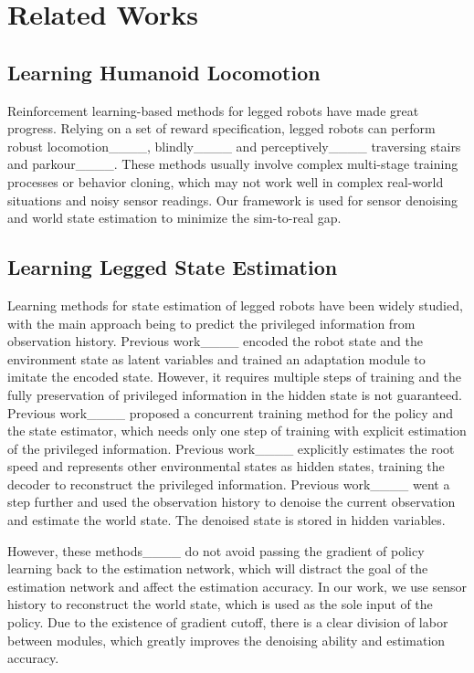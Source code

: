 \section{Related Works}
\subsection{Learning Humanoid Locomotion}
Reinforcement learning-based methods for legged robots have made great progress. Relying on a set of reward specification, legged robots can perform robust locomotion____, blindly____ and perceptively____ traversing stairs and parkour____. These methods usually involve complex multi-stage training processes or behavior cloning, which may not work well in complex real-world situations and noisy sensor readings. Our framework is used for sensor denoising and world state estimation to minimize the sim-to-real gap.

\subsection{Learning Legged State Estimation}
Learning methods for state estimation of legged robots have been widely studied, with the main approach being to predict the privileged information from observation history. Previous work____ encoded the robot state and the environment state as latent variables and trained an adaptation module to imitate the encoded state. However, it requires multiple steps of training and the fully preservation of privileged information in the hidden state is not guaranteed. Previous work____ proposed a concurrent training method for the policy and the state estimator, which needs only one step of training with explicit estimation of the privileged information. Previous work____ explicitly estimates the root speed and represents other environmental states as hidden states, training the decoder to reconstruct the privileged information. Previous work____ went a step further and used the observation history to denoise the current observation and estimate the world state. The denoised state is stored in hidden variables.

However, these methods____ do not avoid passing the gradient of policy learning back to the estimation network, which will distract the goal of the estimation network and affect the estimation accuracy. In our work, we use sensor history to reconstruct the world state, which is used as the sole input of the policy. Due to the existence of gradient cutoff, there is a clear division of labor between modules, which greatly improves the denoising ability and estimation accuracy.